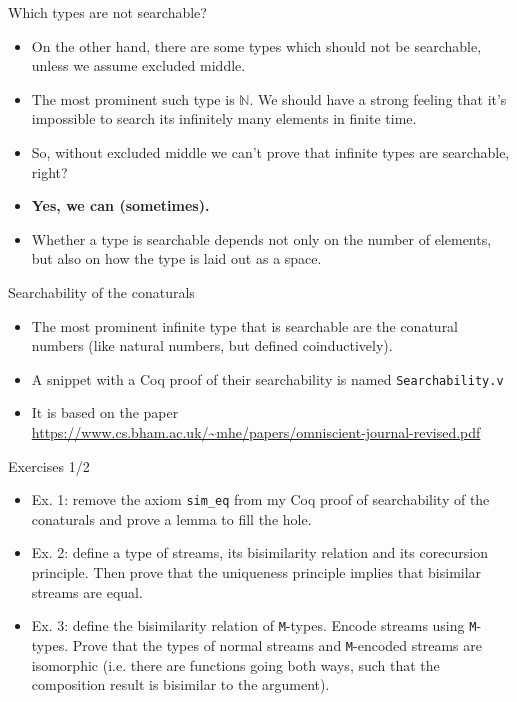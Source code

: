 \documentclass{beamer}
\begin{document}
\begin{frame}{Which types are not searchable?}
\begin{itemize}
	\item On the other hand, there are some types which should not be searchable, unless we assume excluded middle.
	\item The most prominent such type is $\mathbb{N}$. We should have a strong feeling that it's impossible to search its infinitely many elements in finite time.
	\item So, without excluded middle we can't prove that infinite types are searchable, right?
	\item \textbf{Yes, we can (sometimes).}
	\item Whether a type is searchable depends not only on the number of elements, but also on how the type is laid out as a space.
\end{itemize}
\end{frame}

\begin{frame}{Searchability of the conaturals}
\begin{itemize}
	\item The most prominent infinite type that is searchable are the conatural numbers (like natural numbers, but defined coinductively).
	\item A snippet with a Coq proof of their searchability is named \texttt{Searchability.v}
	\item It is based on the paper \url{https://www.cs.bham.ac.uk/~mhe/papers/omniscient-journal-revised.pdf}
\end{itemize}
\end{frame}

\begin{frame}{Exercises 1/2}
\begin{itemize}
	\item Ex. 1: remove the axiom \texttt{sim\_eq} from my Coq proof of searchability of the conaturals and prove a lemma to fill the hole.
	\item Ex. 2: define a type of streams, its bisimilarity relation and its corecursion principle. Then prove that the uniqueness principle implies that bisimilar streams are equal.
	\item Ex. 3: define the bisimilarity relation of \texttt{M}-types. Encode streams using \texttt{M}-types. Prove that the types of normal streams and \texttt{M}-encoded streams are isomorphic (i.e. there are functions going both ways, such that the composition result is bisimilar to the argument).
\end{itemize}
\end{frame}
\end{document}
